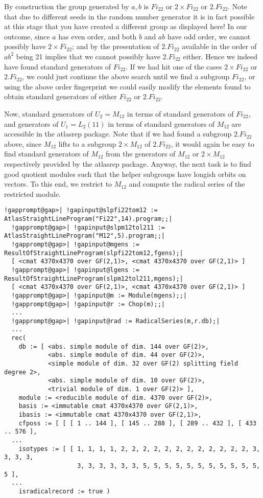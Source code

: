 \documentclass[a4paper,11pt]{report}
\begin{document}
{{ By construction the group generated by $a,b$ is $Fi_{{22}}$ or $2 \times Fi_{{22}}$ or $2.Fi_{{22}}$. Note that due to different seeds in the random number generator it is in
fact possible at this stage that you have created a different group as
displayed here! In our outcome, since $a$ has even order, and both $b$ and $ab$ have odd order, we cannot possibly have $2 \times Fi_{{22}}$; and by the presentation of $2.Fi_{{22}}$ available in \cite{AGR} the order of $ab^2$ being 21 implies that we cannot possibly have $2.Fi_{{22}}$ either. Hence we indeed have found standard generators of $Fi_{{22}}$. If we had hit one of the cases $2 \times Fi_{{22}}$ or $2.Fi_{{22}}$, we could just continue the above search until we find a subgroup $Fi_{{22}}$, or using the above order fingerprint we could easily modify the elements
found to obtain standard generators of either $Fi_{{22}}$ or $2.Fi_{{22}}$. 

 Now, standard generators of $U_2=M_{{12}}$ in terms of standard generators of $Fi_{{22}}$, and generators of $U_1=L_2(11)$ in terms of standard generators of $M_{{12}}$ are accessible in the \textsf{atlasrep} package. Note that if we had found a subgroup $2.Fi_{{22}}$ above, since $M_{{12}}$ lifts to a subgroup $2 \times M_{{12}}$ of $2.Fi_{{22}}$, it would again be easy to find standard generators of $M_{{12}}$ from the generators of $M_{{12}}$ or $2 \times M_{{12}}$ respectively provided by the \textsf{atlasrep} package. Anyway, the next task is to find good quotient modules such that the
helper subgroups have longish orbits on vectors. To this end, we restrict to $M_{{12}}$ and compute the radical series of the restricted module. 
\begin{Verbatim}[commandchars=!@|,fontsize=\small,frame=single,label=Example]
  !gapprompt@gap>| !gapinput@slpfi22tom12 := AtlasStraightLineProgram("Fi22",14).program;;|
  !gapprompt@gap>| !gapinput@slpm12tol211 := AtlasStraightLineProgram("M12",5).program;;|
  !gapprompt@gap>| !gapinput@mgens := ResultOfStraightLineProgram(slpfi22tom12,fgens);|
  [ <cmat 4370x4370 over GF(2,1)>, <cmat 4370x4370 over GF(2,1)> ]
  !gapprompt@gap>| !gapinput@lgens := ResultOfStraightLineProgram(slpm12tol211,mgens);|
  [ <cmat 4370x4370 over GF(2,1)>, <cmat 4370x4370 over GF(2,1)> ] 
  !gapprompt@gap>| !gapinput@m := Module(mgens);;|
  !gapprompt@gap>| !gapinput@r := Chop(m);;|
  ...
  !gapprompt@gap>| !gapinput@rad := RadicalSeries(m,r.db);|
  ...
  rec( 
    db := [ <abs. simple module of dim. 144 over GF(2)>, 
            <abs. simple module of dim. 44 over GF(2)>, 
            <simple module of dim. 32 over GF(2) splitting field degree 2>, 
            <abs. simple module of dim. 10 over GF(2)>, 
            <trivial module of dim. 1 over GF(2)> ],
    module := <reducible module of dim. 4370 over GF(2)>,
    basis := <immutable cmat 4370x4370 over GF(2,1)>,
    ibasis := <immutable cmat 4370x4370 over GF(2,1)>,
    cfposs := [ [ [ 1 .. 144 ], [ 145 .. 288 ], [ 289 .. 432 ], [ 433 .. 576 ],
  ...
    isotypes := [ [ 1, 1, 1, 1, 2, 2, 2, 2, 2, 2, 2, 2, 2, 2, 2, 2, 3, 3, 3, 3,
                    3, 3, 3, 3, 3, 3, 5, 5, 5, 5, 5, 5, 5, 5, 5, 5, 5, 5 ],
  ...
    isradicalrecord := true ) 
\end{Verbatim}
 

}}
\end{document}
